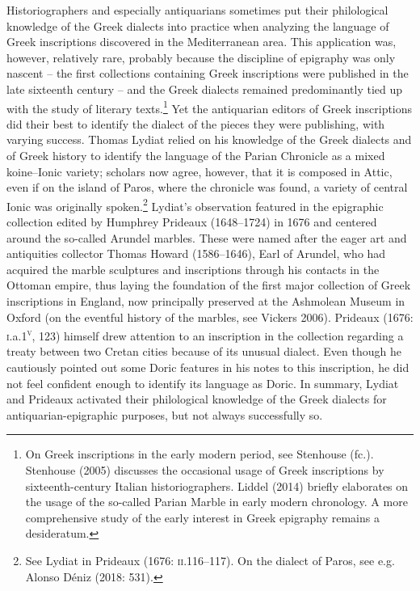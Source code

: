 \documentclass[12pt]{article}
\newenvironment{styleStandard}{\renewcommand\baselinestretch{1.25}\setlength\leftskip{0in}\setlength\rightskip{0in}\setlength\parindent{0.1972in}\setlength\parfillskip{0pt plus 1fil}\setlength\parskip{0in plus 1pt}\writerlistparindent\writerlistleftskip\leavevmode\normalfont\normalsize\writerlistlabel\ignorespaces}{\unskip\vspace{0in plus 1pt}\par}
\newcommand\writerlistleftskip{}
\newcommand\writerlistparindent{}
\newcommand\writerlistlabel{}
\begin{document}
\begin{styleStandard}
Historiographers and especially antiquarians sometimes put their philological knowledge of the Greek dialects into practice when analyzing the language of Greek inscriptions discovered in the Mediterranean area. This application was, however, relatively rare, probably because the discipline of epigraphy was only nascent – the first collections containing Greek inscriptions were published in the late sixteenth century – and the Greek dialects remained predominantly tied up with the study of literary texts.\footnote{ On Greek inscriptions in the early modern period, see Stenhouse (fc.). Stenhouse (2005) discusses the occasional usage of Greek inscriptions by sixteenth-century Italian historiographers. Liddel (2014) briefly elaborates on the usage of the so-called Parian Marble in early modern chronology. A more comprehensive study of the early interest in Greek epigraphy remains a desideratum.} Yet the antiquarian editors of Greek inscriptions did their best to identify the dialect of the pieces they were publishing, with varying success. Thomas Lydiat relied on his knowledge of the Greek dialects and of Greek history to identify the language of the Parian Chronicle as a mixed koine–Ionic variety; scholars now agree, however, that it is composed in Attic, even if on the island of Paros, where the chronicle was found, a variety of central Ionic was originally spoken.\footnote{ See Lydiat in Prideaux (1676: \textsc{ii}.116–117). On the dialect of Paros, see e.g. Alonso Déniz (2018: 531).} Lydiat’s observation featured in the epigraphic collection edited by Humphrey Prideaux (1648–1724) in 1676 and centered around the so-called Arundel marbles. These were named after the eager art and antiquities collector Thomas Howard (1586–1646), Earl of Arundel, who had acquired the marble sculptures and inscriptions through his contacts in the Ottoman empire, thus laying the foundation of the first major collection of Greek inscriptions in England, now principally preserved at the Ashmolean Museum in Oxford (on the eventful history of the marbles, see Vickers 2006). Prideaux (1676: \textsc{i.}a.1\textsc{\textsuperscript{v}}, 123) himself drew attention to an inscription in the collection regarding a treaty between two Cretan cities because of its unusual dialect. Even though he cautiously pointed out some Doric features in his notes to this inscription, he did not feel confident enough to identify its language as Doric. In summary, Lydiat and Prideaux activated their philological knowledge of the Greek dialects for antiquarian-epigraphic purposes, but not always successfully so.
\end{styleStandard}
\end{document}
